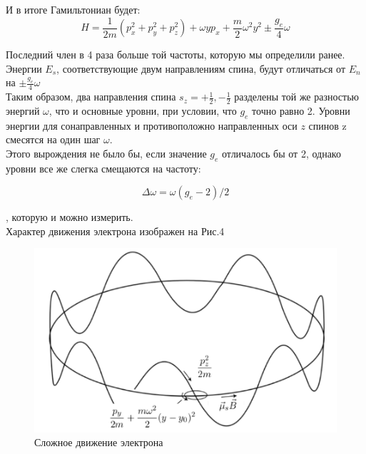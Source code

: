 \documentclass[11pt]{article}
\begin{document}
И в итоге Гамильтониан будет:
\begin{equation}
H=\frac{1}{2m}(p_x^2+p_y^2+p_z^2) + \omega yp_x + \frac{m}{2}\omega^2 y^2 \pm \frac{g_e}{4}\omega
\end{equation}

Последний член в 4 раза больше той частоты, которую мы определили ранее. \\

Энергии $E_s$, соответствующие двум направлениям спина, будут отличаться от $E_n$ на $\pm \frac{g_e}{4}\omega$ \\


Таким образом, два направления спина $s_z=+\frac{1}{2},-\frac{1}{2}$ разделены той же разностью энергий $\omega$, что и основные уровни, при условии, что $g_e$ точно равно 2. Уровни энергии для сонаправленных и противоположно направленных оси $z$ спинов z смесятся на один шаг $\omega$. \\

Этого вырождения не было бы, если значение $g_e$ отличалось бы от 2, однако уровни все же слегка смещаются на частоту:

\begin{equation}
 \Delta\omega=\omega(g_e-2)/2
\end{equation}

, которую и можно измерить.\\

Характер движения электрона изображен на Рис.4\\

\begin{figure}[htp]
\centering
\includegraphics[scale=0.3]{penn_4.png}
\caption{Сложное движение электрона}
\label{}
\end{figure}
\end{document}
